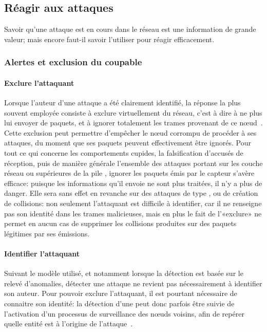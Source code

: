 \subsection{Réagir aux attaques}
Savoir qu'une attaque est en cours dans le réseau est une information de grande valeur; mais encore faut-il savoir l'utiliser pour réagir efficacement.

    \subsubsection{Alertes et exclusion du coupable}
    \paragraph{Exclure l'attaquant}
Lorsque l'auteur d'une attaque a été clairement identifié, la réponse la plus souvent employée consiste à exclure virtuellement du réseau, c'est à dire à ne plus lui envoyer de paquets, et à ignorer totalement les trames provenant de ce nœud~\cite{LC08}.
Cette exclusion peut permettre d'empêcher le nœud corrompu de procéder à ses attaques, du moment que ses paquets peuvent effectivement être ignorés.
Pour tout ce qui concerne les comportements cupides, la falsification d'accusés de réception, puis de manière générale l'ensemble des attaques portant sur les couche réseau ou supérieures de la pile \tcpip, ignorer les paquets émis par le capteur s'avère efficace: puisque les informations qu'il envoie ne sont plus traitées, il n'y a plus de danger.
Elle sera sans effet en revanche sur des attaques de type , ou de création de collisions: non seulement l'attaquant est difficile à identifier, car il ne renseigne pas son identité dans les trames malicieuses, mais en plus le fait de l'«exclure» ne permet en aucun cas de supprimer les collisions produites sur des paquets légitimes par ses émissions.

        \paragraph{Identifier l'attaquant}
Suivant le modèle utilisé, et notamment lorsque la détection est basée sur le relevé d'anomalies, détecter une attaque ne revient pas nécessairement à identifier son auteur.
Pour pouvoir exclure l'attaquant, il est pourtant nécessaire de connaitre son identité: la détection d'une  peut donc parfois être suivie de l'activation d'un processus de surveillance des nœuds voisins, afin de repérer quelle entité est à l'origine de l'attaque~\cite{BMS13}.

